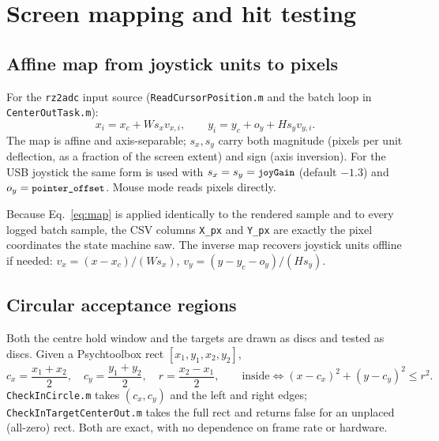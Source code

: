 \documentclass[11pt,a4paper]{article}
\newcommand{\code}[1]{\texttt{\small #1}}
\newcommand{\file}[1]{\texttt{\small #1}}
\begin{document}
\section{Screen mapping and hit testing}
\label{sec:screen}

\subsection{Affine map from joystick units to pixels}

For the \code{rz2adc} input source (\file{ReadCursorPosition.m} and the batch
loop in \file{CenterOutTask.m}):
\begin{equation}
  x_i = x_c + W s_x v_{x,i},
  \qquad
  y_i = y_c + o_y + H s_y v_{y,i}.
  \label{eq:map}
\end{equation}
The map is affine and axis-separable; $s_x, s_y$ carry both magnitude (pixels
per unit deflection, as a fraction of the screen extent) and sign (axis
inversion). For the USB joystick the same form is used with
$s_x = s_y = \code{joyGain}$ (default $-1.3$) and $o_y =
\code{pointer\_offset}$. Mouse mode reads pixels directly.

Because Eq.~\eqref{eq:map} is applied identically to the rendered sample and to
every logged batch sample, the CSV columns \code{X\_px} and \code{Y\_px} are
exactly the pixel coordinates the state machine saw. The inverse map recovers
joystick units offline if needed:
$v_x = (x - x_c)/(W s_x)$, $v_y = (y - y_c - o_y)/(H s_y)$.

\subsection{Circular acceptance regions}

Both the centre hold window and the targets are drawn as discs and tested as
discs. Given a Psychtoolbox rect $[x_1, y_1, x_2, y_2]$,
\begin{equation}
  c_x = \frac{x_1 + x_2}{2}, \quad
  c_y = \frac{y_1 + y_2}{2}, \quad
  r   = \frac{x_2 - x_1}{2},
  \qquad
  \text{inside} \iff (x - c_x)^2 + (y - c_y)^2 \le r^2 .
  \label{eq:circle}
\end{equation}
\file{CheckInCircle.m} takes $(c_x, c_y)$ and the left and right edges;
\file{CheckInTargetCenterOut.m} takes the full rect and returns false for an
unplaced (all-zero) rect. Both are exact, with no dependence on frame rate or
hardware.
\end{document}
